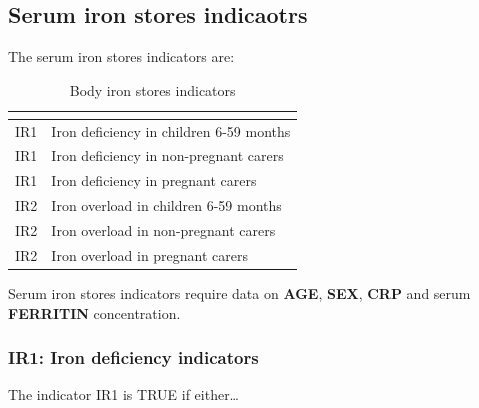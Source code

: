 \documentclass[12pt,a4paper]{article}
\begin{document}
\hypertarget{serum-iron-stores-indicaotrs}{%
\subsection{Serum iron stores indicaotrs}\label{serum-iron-stores-indicaotrs}}

The serum iron stores indicators are:

\begin{table}[H]

\caption{\label{tab:iron-deficiency}Body iron stores indicators}
\centering
\begin{tabular}[t]{ll}
\toprule
\textbf{} & \textbf{}\\
\midrule
\rowcolor{gray!6}  IR1 & Iron deficiency in children 6-59 months\\
IR1 & Iron deficiency in non-pregnant carers\\
\rowcolor{gray!6}  IR1 & Iron deficiency in pregnant carers\\
IR2 & Iron overload in children 6-59 months\\
\rowcolor{gray!6}  IR2 & Iron overload in non-pregnant carers\\
\addlinespace
IR2 & Iron overload in pregnant carers\\
\bottomrule
\end{tabular}
\end{table}

Serum iron stores indicators require data on \textbf{AGE}, \textbf{SEX}, \textbf{CRP} and serum \textbf{FERRITIN} concentration.

\hypertarget{ir1-iron-deficiency-indicators}{%
\subsubsection{IR1: Iron deficiency indicators}\label{ir1-iron-deficiency-indicators}}

The indicator IR1 is TRUE if either\ldots{}
\end{document}
